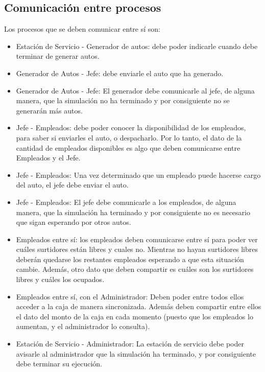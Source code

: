 \documentclass[a4paper,12pt]{article}
\begin{document}
\subsection{Comunicación entre procesos}
Los procesos que se deben comunicar entre sí son:
\begin{itemize}
	\item Estación de Servicio - Generador de autos: debe poder indicarle cuando debe terminar
	de generar autos.
	\item Generador de Autos - Jefe: debe enviarle el auto que ha generado.
	\item Generador de Autos - Jefe: El generador debe comunicarle al jefe, de alguna manera,
	que	la simulación no ha terminado y por consiguiente no se generarán más autos.
	\item Jefe - Empleados: debe poder conocer la disponibilidad de los empleados, para saber
	si enviarles el auto, o despacharlo. Por lo tanto, el dato de la cantidad de empleados
	disponibles es algo que deben comunicarse entre Empleados y el Jefe.
	\item Jefe - Empleados: Una vez determinado que un empleado puede hacerse cargo del auto, 
	el jefe debe enviar el auto.
	\item Jefe - Empleados: El jefe debe comunicarle a los empleados, de alguna manera, que
	la simulación ha terminado y por consiguiente no es necesario que sigan esperando por
	otros autos. 
	\item Empleados entre sí: los empleados deben comunicarse entre sí para poder ver cuáles
	surtidores están libres y cuales no. Mientras no hayan surtidores libres deberán quedarse
	los restantes empleados esperando a que esta situación cambie. Además, otro dato que deben
	compartir es cuáles son los surtidores libres y cuáles los ocupados.
	\item Empleados entre sí, con el Administrador: Deben poder entre todos ellos acceder a
	la caja de manera sincronizada. Además deben compartir entre ellos el dato del monto de
	la caja en cada momento (puesto que los empleados lo aumentan, y el administrador lo
	consulta).
	\item Estación de Servicio - Administrador: La estación de servicio debe poder avisarle
	al administrador que la simulación ha terminado, y por consiguiente debe terminar su
	ejecución.
\end{itemize}
\end{document}
